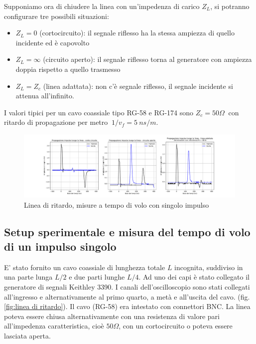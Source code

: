 \documentclass[journal]{IEEEtran}
\begin{document}
Supponiamo ora di chiudere la linea con un'impedenza di carico $Z_L$, si potranno configurare tre possibili situazioni: 
\begin{itemize}
    \item $Z_L = 0$ (cortocircuito): il segnale riflesso ha la stessa ampiezza di quello incidente ed è capovolto
    \item $Z_L = \infty$ (circuito aperto): il segnale riflesso torna al generatore con ampiezza doppia rispetto a quello trasmesso
    \item $Z_L = Z_c$ (linea adattata): non c'è segnale riflesso, il segnale incidente si attenua all'infinito.
\end{itemize}

I valori tipici per un cavo coassiale tipo RG-58 e RG-174 sono $Z_c = 50 \Omega \ $ con ritardo di propagazione per metro $  \ 1/v_f = 5 \ ns/m $.

\begin{figure}[h]%
\centering
\begin{center}
\includegraphics[trim = {150pt 0 0 0}, width=1.1\textwidth]{analysis/output/Delay_line_pulse.pdf}
\caption{Linea di ritardo, misure a tempo di volo con singolo impulso}
\label{fig:singolo impulso}
\end{center}
\end{figure}


\subsection{\textbf{Setup sperimentale e misura del tempo di volo  di un impulso singolo}}
E' stato fornito un cavo coassiale di lunghezza totale $L$ incognita, suddiviso in una parte lunga $L/2$ e due parti lunghe $L/4$. Ad uno dei capi è stato collegato il generatore di segnali Keithley 3390. I canali dell'oscilloscopio sono stati collegati all'ingresso e alternativamente al primo quarto, a metà e all'uscita del cavo. (fig. \ref{fig:linea di ritardo}). Il cavo (RG-58) era intestato con connettori BNC.
La linea poteva essere chiusa alternativamente con una resistenza di valore pari all'impedenza caratteristica, cioè $50 \Omega$, con un cortocircuito o poteva essere lasciata aperta.
\end{document}

